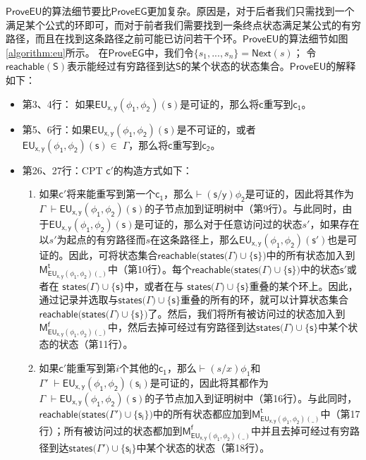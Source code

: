 $\mathsf{ProveEU}$的算法细节要比$\mathsf{ProveEG}$更加复杂。原因是，对于后者我们只需找到一个满足某个公式的环即可，而对于前者我们需要找到一条终点状态满足某公式的有穷路径，而且在找到这条路径之前可能已访问若干个环。$\mathsf{ProveEU}$的算法细节如图\ref{algorithm:eu}所示。
在$\mathsf{ProveEG}$中，我们令$\{s_1,...,s_n\}=\textsf{Next}(s)$；
令$\mathsf{reachable(S)}$表示能经过有穷路径到达$\mathsf{S}$的某个状态的状态集合。$\mathsf{ProveEU}$的解释如下：
\begin{itemize}
	\item 第3、4行： 如果$\mathsf{EU_{x,y}(\phi_1,\phi_2)(s)}$是可证的，那么将$\mathsf{c}$重写到$\mathsf{c_1}$。
	\item 第5、6行：如果$\mathsf{EU_{x,y}(\phi_1,\phi_2)(s)}$是不可证的，或者$\mathsf{EU_{x,y}(\phi_1,\phi_2)(s)\in}\;\Gamma$，那么将$\mathsf{c}$重写到$\mathsf{c_2}$。
	\item 第26、27行：\textsf{CPT} $\mathsf{c'}$的构造方式如下：
	\begin{enumerate}
		\item 如果$\mathsf{c'}$将来能重写到第一个$\mathsf{c_1}$，那么$\mathsf{\vdash(s/y)\phi_2}$是可证的，因此将其作为$\Gamma\;\mathsf{\vdash EU_{x,y}(\phi_1,\phi_2)(s)}$的子节点加到证明树中（第9行）。与此同时，由于$\mathsf{EU_{x,y}(\phi_1,\phi_2)(s)}$是可证的，那么对于任意访问过的状态$s'$，如果存在以$s'$为起点的有穷路径而$s$在这条路径上，那么$\mathsf{EU_{x,y}(\phi_1,\phi_2)(s')}$也是可证的。因此，可将状态集合$\mathsf{reachable(states(}\Gamma\mathsf{)\cup\{s\})}$中的所有状态加入到 $\mathsf{M_{EU_{x,y}(\phi_1,\phi_2)(\_)}^t}$中（第10行）。每个$\mathsf{reachable(states(}\Gamma\mathsf{)\cup\{s\})}$中的状态$\mathsf{s'}$或者在 $\mathsf{states(}\Gamma\mathsf{)\cup\{s\}}$中，或者在与 $\mathsf{states(}\Gamma\mathsf{)\cup\{s\}}$重叠的某个环上。因此，通过记录并选取与$\mathsf{states(}\Gamma\mathsf{)\cup\{s\}}$重叠的所有的环，就可以计算状态集合 $\mathsf{reachable(states(}\Gamma\mathsf{)\cup\{s\})}$了。然后，我们将所有被访问过的状态加入到$\mathsf{M_{EU_{x,y}(\phi_1,\phi_2)(\_)}^f}$中，然后去掉可经过有穷路径到达$\mathsf{states(}\Gamma\mathsf{)\cup\{s\}}$中某个状态的状态（第11行）。
		\item 如果$\mathsf{c'}$能重写到第$i$个其他的$\mathsf{c_1}$，那么$\vdash(s/x)\phi_1$和 $\Gamma'\;\mathsf{\vdash EU_{x,y}(\phi_1,\phi_2)(s_i)}$是可证的，因此将其都作为$\Gamma\;\mathsf{\vdash EU_{x,y}(\phi_1,\phi_2)(s)}$的子节点加入到证明树中（第16行）。与此同时，$\mathsf{reachable(states(}\Gamma'\mathsf{)\cup\{s_i\})}$中的所有状态都应加到$\mathsf{M_{EU_{x,y}(\phi_1,\phi_2)(\_)}^t}$中（第17行）；所有被访问过的状态都加到$\mathsf{M_{EU_{x,y}(\phi_1,\phi_2)(\_)}^f}$中并且去掉可经过有穷路径到达$\mathsf{states(}\Gamma'\mathsf{)\cup\{s_i\}}$中某个状态的状态（第18行）。 
		

\end{enumerate}
\end{itemize}

